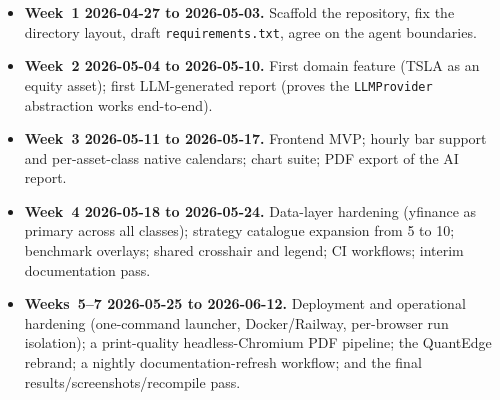 \begin{itemize}
  \item \textbf{Week~1 \textemdash{} 2026-04-27 to 2026-05-03.} Scaffold the
        repository, fix the directory layout, draft \texttt{requirements.txt}, agree
        on the agent boundaries.
  \item \textbf{Week~2 \textemdash{} 2026-05-04 to 2026-05-10.} First domain feature
        (TSLA as an equity asset); first LLM-generated report (proves the
        \texttt{LLMProvider} abstraction works end-to-end).
  \item \textbf{Week~3 \textemdash{} 2026-05-11 to 2026-05-17.} Frontend MVP;
        hourly bar support and per-asset-class native calendars; chart suite; PDF
        export of the AI report.
  \item \textbf{Week~4 \textemdash{} 2026-05-18 to 2026-05-24.} Data-layer
        hardening (yfinance as primary across all classes); strategy catalogue
        expansion from 5 to 10; benchmark overlays; shared crosshair and legend;
        CI workflows; interim documentation pass.
  \item \textbf{Weeks~5--7 \textemdash{} 2026-05-25 to 2026-06-12.} Deployment and
        operational hardening (one-command launcher, Docker/Railway, per-browser
        run isolation); a print-quality headless-Chromium PDF pipeline; the
        QuantEdge rebrand; a nightly documentation-refresh workflow; and the final
        results/screenshots/recompile pass.
\end{itemize}
